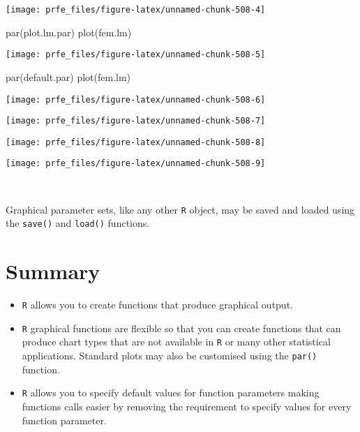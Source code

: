 \documentclass[
  12pt,
  a4paper]{book}
\newenvironment{Shaded}{\begin{snugshade}}{\end{snugshade}}
\newcommand{\FunctionTok}[1]{\textcolor[rgb]{0.00,0.00,0.00}{#1}}
\newcommand{\NormalTok}[1]{#1}
\begin{document}
\begin{center}\texttt{[image: prfe\_files/figure-latex/unnamed-chunk-508-4]} \end{center}

\begin{Shaded}
\begin{Highlighting}[]
\FunctionTok{par}\NormalTok{(plot.lm.par)}
\FunctionTok{plot}\NormalTok{(fem.lm)}
\end{Highlighting}
\end{Shaded}

\begin{center}\texttt{[image: prfe\_files/figure-latex/unnamed-chunk-508-5]} \end{center}

\begin{Shaded}
\begin{Highlighting}[]
\FunctionTok{par}\NormalTok{(default.par)}
\FunctionTok{plot}\NormalTok{(fem.lm)}
\end{Highlighting}
\end{Shaded}

\begin{center}\texttt{[image: prfe\_files/figure-latex/unnamed-chunk-508-6]} \end{center}

\begin{center}\texttt{[image: prfe\_files/figure-latex/unnamed-chunk-508-7]} \end{center}

\begin{center}\texttt{[image: prfe\_files/figure-latex/unnamed-chunk-508-8]} \end{center}

\begin{center}\texttt{[image: prfe\_files/figure-latex/unnamed-chunk-508-9]} \end{center}

~

Graphical parameter sets, like any other \texttt{R} object, may be saved and loaded using the \texttt{save()} and \texttt{load()} functions.

\hypertarget{summary-7}{%
\section{Summary}\label{summary-7}}

\begin{itemize}
\item
  \texttt{R} allows you to create functions that produce graphical output.
\item
  \texttt{R} graphical functions are flexible so that you can create functions that can produce chart types that are not available in \texttt{R} or many other statistical applications. Standard plots may also be customised using the \texttt{par()} function.
\item
  \texttt{R} allows you to specify default values for function parameters making functions calls easier by removing the requirement to specify values for every function parameter.
\end{itemize}
\end{document}

